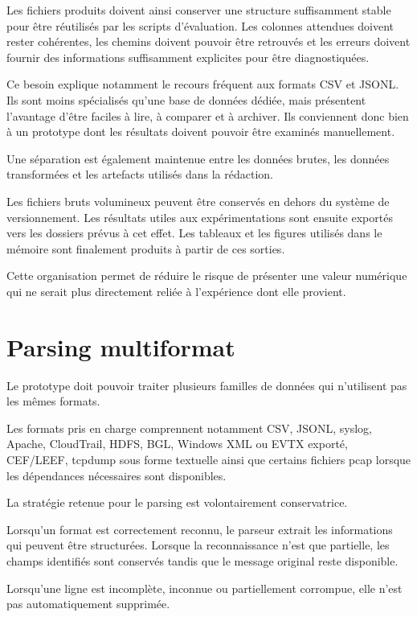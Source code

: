 Les fichiers produits doivent ainsi conserver une structure suffisamment stable pour être réutilisés par les scripts d'évaluation. Les colonnes attendues doivent rester cohérentes, les chemins doivent pouvoir être retrouvés et les erreurs doivent fournir des informations suffisamment explicites pour être diagnostiquées.

Ce besoin explique notamment le recours fréquent aux formats CSV et JSONL. Ils sont moins spécialisés qu'une base de données dédiée, mais présentent l'avantage d'être faciles à lire, à comparer et à archiver. Ils conviennent donc bien à un prototype dont les résultats doivent pouvoir être examinés manuellement.

Une séparation est également maintenue entre les données brutes, les données transformées et les artefacts utilisés dans la rédaction.

Les fichiers bruts volumineux peuvent être conservés en dehors du système de versionnement. Les résultats utiles aux expérimentations sont ensuite exportés vers les dossiers prévus à cet effet. Les tableaux et les figures utilisés dans le mémoire sont finalement produits à partir de ces sorties.

Cette organisation permet de réduire le risque de présenter une valeur numérique qui ne serait plus directement reliée à l'expérience dont elle provient.

\section{Parsing multiformat}

Le prototype doit pouvoir traiter plusieurs familles de données qui n'utilisent pas les mêmes formats.

Les formats pris en charge comprennent notamment CSV, JSONL, syslog, Apache, CloudTrail, HDFS, BGL, Windows XML ou EVTX exporté, CEF/LEEF, tcpdump sous forme textuelle ainsi que certains fichiers pcap lorsque les dépendances nécessaires sont disponibles.

La stratégie retenue pour le parsing est volontairement conservatrice.

Lorsqu'un format est correctement reconnu, le parseur extrait les informations qui peuvent être structurées. Lorsque la reconnaissance n'est que partielle, les champs identifiés sont conservés tandis que le message original reste disponible.

Lorsqu'une ligne est incomplète, inconnue ou partiellement corrompue, elle n'est pas automatiquement supprimée.

